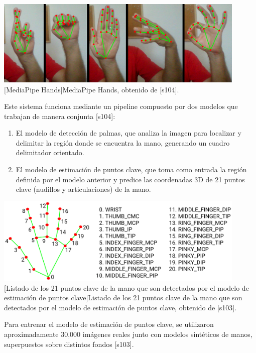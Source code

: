 \begin{center}
    \includegraphics[width=0.9\textwidth]{Images/Cap 2/MediaPipe_Hands.png}
    [MediaPipe Hands]{MediaPipe Hands, obtenido de [s104].}  %
\end{center}

Este sistema funciona mediante un pipeline compuesto por dos modelos que trabajan de manera conjunta [s104]:

\begin{enumerate}
    \item El modelo de detección de palmas, que analiza la imagen para localizar y delimitar la región donde se encuentra la mano, generando un cuadro delimitador orientado.
    \item El modelo de estimación de puntos clave, que toma como entrada la región definida por el modelo anterior y predice las coordenadas 3D de 21 puntos clave (nudillos y articulaciones) de la mano.
\end{enumerate}

\begin{center}
\includegraphics[width=0.9\textwidth]{Images/Cap 2/MediaPipe_hand_landmarks.png}
[Listado de los 21 puntos clave de la mano que son detectados por el modelo de estimación de puntos clave]{Listado de los 21 puntos clave de la mano que son detectados por el modelo de estimación de puntos clave, obtenido de [s103].}  %
\end{center}


Para entrenar el modelo de estimación de puntos clave, se utilizaron aproximadamente 30,000 imágenes reales junto con modelos sintéticos de manos, superpuestos sobre distintos fondos [s103].\\

